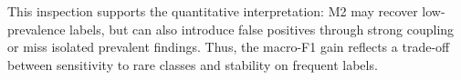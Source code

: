 \documentclass[12pt]{article}
\begin{document}
This inspection supports the quantitative interpretation: M2 may recover low-prevalence labels, but can also introduce false positives through strong coupling or miss isolated prevalent findings. Thus, the macro-F1 gain reflects a trade-off between sensitivity to rare classes and stability on frequent labels.




\end{document}
